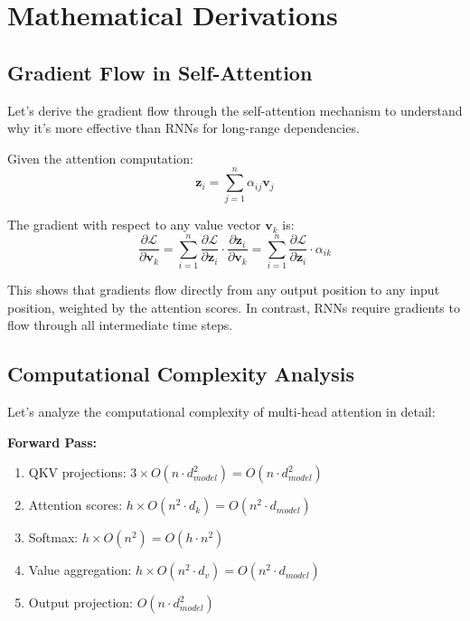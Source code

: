 
\section{Mathematical Derivations}

\subsection{Gradient Flow in Self-Attention}

Let's derive the gradient flow through the self-attention mechanism to understand why it's more effective than RNNs for long-range dependencies.

Given the attention computation:
\begin{equation}
\mathbf{z}_i = \sum_{j=1}^{n} \alpha_{ij} \mathbf{v}_j
\end{equation}

The gradient with respect to any value vector $\mathbf{v}_k$ is:
\begin{equation}
\frac{\partial \mathcal{L}}{\partial \mathbf{v}_k} = \sum_{i=1}^{n} \frac{\partial \mathcal{L}}{\partial \mathbf{z}_i} \cdot \frac{\partial \mathbf{z}_i}{\partial \mathbf{v}_k} = \sum_{i=1}^{n} \frac{\partial \mathcal{L}}{\partial \mathbf{z}_i} \cdot \alpha_{ik}
\end{equation}

This shows that gradients flow directly from any output position to any input position, weighted by the attention scores. In contrast, RNNs require gradients to flow through all intermediate time steps.

\subsection{Computational Complexity Analysis}

Let's analyze the computational complexity of multi-head attention in detail:

\textbf{Forward Pass:}
\begin{enumerate}
    \item QKV projections: $3 \times O(n \cdot d_{model}^2) = O(n \cdot d_{model}^2)$
    \item Attention scores: $h \times O(n^2 \cdot d_k) = O(n^2 \cdot d_{model})$
    \item Softmax: $h \times O(n^2) = O(h \cdot n^2)$
    \item Value aggregation: $h \times O(n^2 \cdot d_v) = O(n^2 \cdot d_{model})$
    \item Output projection: $O(n \cdot d_{model}^2)$
\end{enumerate}

